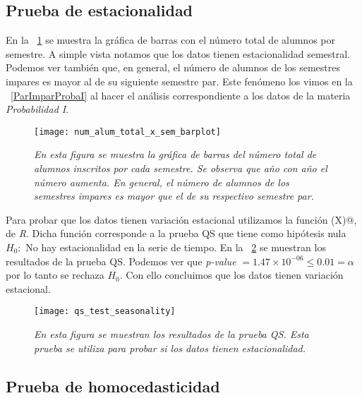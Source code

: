 \subsection{Prueba de estacionalidad}

En la \figurename{~\ref{TotalAlumBarras}} se muestra la gráfica de barras con el número total de alumnos por semestre. A simple vista notamos que los datos tienen estacionalidad semestral. Podemos ver también que, en general, el número de alumnos de los semestres impares es mayor al de su siguiente semestre par. Este fenómeno los vimos en la \figurename{~\ref{ParImparProbaI}} al hacer el análisis correspondiente a los datos de la materia \textit{Probabilidad I}.

\begin{figure}[H]
\centering
\texttt{[image: num\_alum\_total\_x\_sem\_barplot]} %
\caption[\textit{Número total de alumnos por semestre}]{\textit{En esta figura se muestra la gráfica de barras del número total de alumnos inscritos por cada semestre. Se observa que año con año el número aumenta. En general, el número de alumnos de los semestres impares es mayor que el de su respectivo semestre par.}}\label{TotalAlumBarras}
\end{figure}


Para probar que los datos tienen variación estacional utilizamos la función \verb@qs(X)@, de \textit{R}. Dicha función corresponde a la prueba QS que tiene como hipótesis nula $H_{0}:$ No hay estacionalidad en la serie de tiempo. En la \figurename{~\ref{QS_testSeasonality}} se muestran los resultados de la prueba QS. Podemos ver que \textit{p-value} $ = 1.47 \times 10^{-06} \leqslant 0.01 = \alpha$ por lo tanto se rechaza $H_{0}$. Con ello concluimos que los datos tienen variación estacional.

\begin{figure}[H]
\centering
\texttt{[image: qs\_test\_seasonality]} %
\caption[\textit{Prueba QS para estacionalidad}]{\textit{En esta figura se muestran los resultados de la prueba QS. Esta prueba se utiliza para probar si los datos tienen estacionalidad.}}\label{QS_testSeasonality}
\end{figure}


\subsection{Prueba de homocedasticidad}

